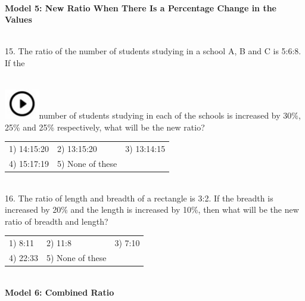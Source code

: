 \documentclass{article}
\begin{document}
	\noindent 
	
	\noindent \\   \textbf{Model 5: New Ratio When There Is a Percentage Change in the Values}
	
	\noindent 
	
	\noindent 
	
	\noindent \\   15. The ratio of the number of students studying in a school A, B and C is 5:6:8. If the
	
	\noindent  
	\noindent \\ \includegraphics*[width=0.60in, height=0.52in]{images/image1}number of students studying in each of the schools is increased by 30\%, 25\% and 25\% respectively, what will be the new ratio?
	
	\noindent 
	
	\noindent \begin{tabular}{p{1.7in} p{1.6in} p{1.6in}} \\ 
 1) 14:15:20              &  2) 13:15:20       &  3) 13:14:15       \\
4) 15:17:19       & 5) None of these  \\
\end{tabular}
	
	\noindent 
	
	\noindent 
	
	\noindent 
	
	\noindent  \\  16. The ratio of length and breadth of a rectangle is 3:2. If the breadth is increased by 20\% and the length is increased by 10\%, then what will be the new ratio of breadth and length?
	
	\noindent \begin{tabular}{p{1.7in} p{1.6in} p{1.6in}} \\ 
 1) 8:11                     &  2) 11:8              &  3) 7:10              \\
4) 22:33            & 5) None of these  \\
\end{tabular}
	
	\noindent 
	
	\noindent 
	
	\noindent 
	
	\noindent 
	
	\noindent \\   \textbf{Model 6: Combined Ratio}
	
\end{document}
